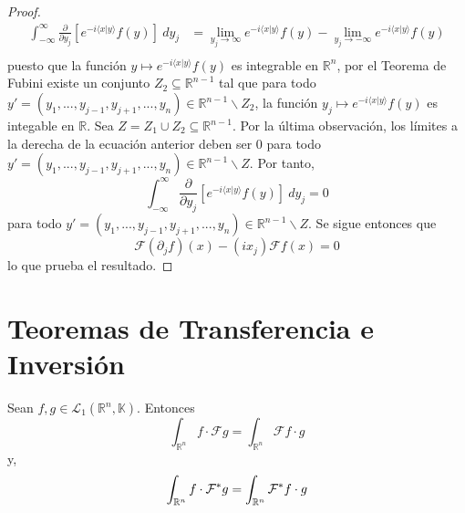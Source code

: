 \documentclass[12pt]{report}
\theoremstyle{largebreak}
\newcommand\pint[2]{\ensuremath{\langle#1| #2\rangle}}
\newcommand{\fou}[1]{\ensuremath{\mathcal{F}#1}}
\begin{document}
\begin{proof}
        \begin{equation*}
            \begin{split}
                \int_{-\infty}^\infty\frac{\partial}{\partial y_j}\left[e^{-i\pint{x}{y}}f(y)\right] \:dy_j&=\lim_{ y_j\rightarrow\infty}e^{ -i\pint{x}{y}}f(y)-\lim_{ y_j\rightarrow-\infty}e^{ -i\pint{x}{y}}f(y)\\
            \end{split}
        \end{equation*}
        puesto que la función $y\mapsto e^{ -i\pint{x}{y}}f(y)$ es integrable en $\mathbb{R}^n$, por el Teorema de Fubini existe un conjunto $Z_2\subseteq\mathbb{R}^{ n-1}$ tal que para todo $y'=(y_1,...,y_{ j-1},y_{ j+1},...,y_n)\in\mathbb{R}^{ n-1}\backslash Z_2$, la función $y_j\mapsto e^{ -i\pint{x}{y}}f(y)$ es integable en $\mathbb{R}$. Sea $Z=Z_1\cup Z_2\subseteq\mathbb{R}^{ n-1}$. Por la última observación, los límites a la derecha de la ecuación anterior deben ser $0$ para todo $y'=(y_1,...,y_{ j-1},y_{ j+1},...,y_n)\in\mathbb{R}^{n-1}\backslash Z$. Por tanto,
        \begin{equation*}
            \int_{-\infty}^\infty\frac{\partial}{\partial y_j}\left[e^{-i\pint{x}{y}}f(y)\right] \:dy_j =0
        \end{equation*}
        para todo $y'=(y_1,...,y_{ j-1},y_{ j+1},...,y_n)\in\mathbb{R}^{n-1}\backslash Z$. Se sigue entonces que
        \begin{equation*}
            \fou{(\partial_jf)}(x)-(ix_j)\fou{f}(x)=0
        \end{equation*}
        lo que prueba el resultado.
    \end{proof}

    \section{Teoremas de Transferencia e Inversión}

    \begin{theor}
        Sean $f,g\in\mathcal{L}_1(\mathbb{R}^n,\mathbb{K})$. Entonces
        \begin{equation*}
            \int_{\mathbb{R}^n}f\cdot\fou{g}=\int_{\mathbb{R}^n}\fou{f}\cdot g
        \end{equation*}
        y,
        \begin{equation*}
            \int_{\mathbb{R}^n}f\cdot\fou^*{g}=\int_{\mathbb{R}^n}\fou^*{f}\cdot g
        \end{equation*}
    \end{theor}
\end{document}
